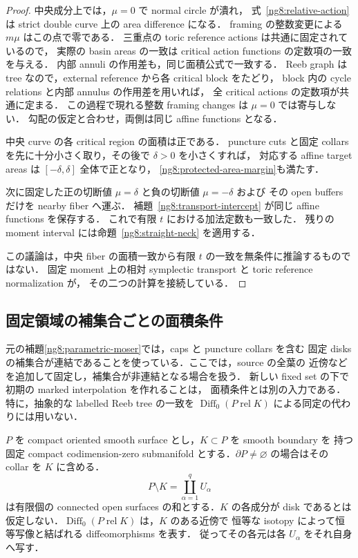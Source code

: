 \begin{proof}
中央成分上では，$\mu=0$ で normal circle が潰れ，
式~\eqref{ng8:relative-action} は strict double curve 上の area difference になる．
framing の整数変更による $m\mu$ はこの点で零である．
三重点の toric reference actions は共通に固定されているので，
実際の basin areas の一致は critical action functions の定数項の一致を与える．
内部 annuli の作用差も，同じ面積公式で一致する．
Reeb graph は tree なので，external reference から各 critical block をたどり，
block 内の cycle relations と内部 annulus の作用差を用いれば，
全 critical actions の定数項が共通に定まる．
この過程で現れる整数 framing changes は $\mu=0$ では寄与しない．
勾配の仮定と合わせ，両側は同じ affine functions となる．

中央 curve の各 critical region の面積は正である．
puncture cuts と固定 collars を先に十分小さく取り，その後で $\delta>0$ を小さくすれば，
対応する affine target areas は $[-\delta,\delta]$ 全体で正となり，
\eqref{ng8:protected-area-margin}も満たす．

次に固定した正の切断値 $\mu=\delta$ と負の切断値 $\mu=-\delta$ および
その open buffers だけを nearby fiber へ運ぶ．
補題~\ref{ng8:transport-intercept} が同じ affine functions を保存する．
これで有限 $t$ における加法定数も一致した．
残りの moment interval には命題~\ref{ng8:straight-neck} を適用する．

この議論は，中央 fiber の面積一致から有限 $t$ の一致を無条件に推論するものではない．
固定 moment 上の相対 symplectic transport と toric reference normalization が，
その二つの計算を接続している．
\end{proof}


\subsection{固定領域の補集合ごとの面積条件}
\label{ng8:componentwise-area}

元の補題\ref{ng8:parametric-moser}では，caps と puncture collars を含む
固定 disks の補集合が連結であることを使っている．ここでは，source の全葉の
近傍などを追加して固定し，補集合が非連結となる場合を扱う．
新しい fixed set の下で初期の marked interpolation を作れることは，
面積条件とは別の入力である．特に，抽象的な labelled Reeb tree の一致を
$\operatorname{Diff}_0(P\operatorname{ rel}K)$ による同定の代わりには用いない．

$P$ を compact oriented smooth surface とし，$K\subset P$ を smooth boundary を
持つ固定 compact codimension-zero submanifold とする．$\partial P\ne\varnothing$
の場合はその collar を $K$ に含める．
\[
 P\setminus K=\coprod_{\alpha=1}^q U_\alpha
\]
は有限個の connected open surfaces の和とする．$K$ の各成分が disk であるとは
仮定しない．$\operatorname{Diff}_0(P\operatorname{ rel}K)$ は，$K$ のある近傍で
恒等な isotopy によって恒等写像と結ばれる diffeomorphisms を表す．
従ってその各元は各 $U_\alpha$ をそれ自身へ写す．

